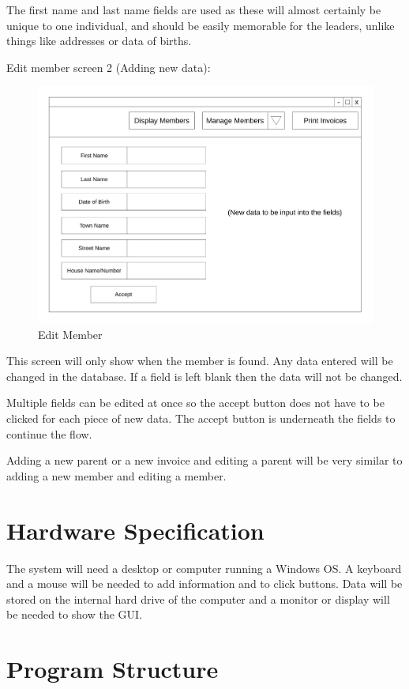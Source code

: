 The first name and last name fields are used as these will almost certainly be unique to one individual, and should be easily memorable for the leaders, unlike things like addresses or data of births.

Edit member screen 2 (Adding new data):
\begin{figure}[H]
\includegraphics[width=\textwidth]{./Design/images/Edit_Member_2.pdf}
    \caption{Edit Member} \label{fig:Interface Design}
\end{figure}
This screen will only show when the member is found. Any data entered will be changed in the database. If a field is left blank then the data will not be changed.

Multiple fields can be edited at once so the accept button does not have to be clicked for each piece of new data. The accept button is underneath the fields to continue the flow.

Adding a new parent or a new invoice and editing a parent will be very similar to adding a new member and editing a member.



\section{Hardware Specification}
The system will need a desktop or computer running a Windows OS. A keyboard and a mouse will be needed to add information and to click buttons. Data will be stored on the internal hard drive of the computer and a monitor or display will be needed to show the GUI.

\section{Program Structure}

